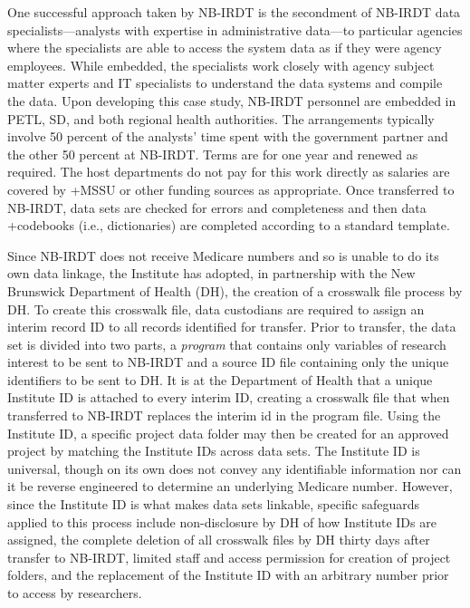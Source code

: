 \documentclass[
]{book}
\begin{document}
One successful approach taken by NB-IRDT is the secondment of NB-IRDT data specialists---analysts with expertise in administrative data---to particular agencies where the specialists are able to access the system data as if they were agency employees. While embedded, the specialists work closely with agency subject matter experts and IT specialists to understand the data systems and compile the data. Upon developing this case study, NB-IRDT personnel are embedded in PETL, SD, and both regional health authorities. The arrangements typically involve 50 percent of the analysts' time spent with the government partner and the other 50 percent at NB-IRDT. Terms are for one year and renewed as required. The host departments do not pay for this work directly as salaries are covered by +MSSU\textbar{} or other funding sources as appropriate. Once transferred to NB-IRDT, data sets are checked for errors and completeness and then data +codebooks\textbar{} (i.e., dictionaries) are completed according to a standard template.

Since NB-IRDT does not receive Medicare numbers and so is unable to do its own data linkage, the Institute has adopted, in partnership with the New Brunswick Department of Health (DH), the creation of a crosswalk file process by DH. To create this crosswalk file, data custodians are required to assign an interim record ID to all records identified for transfer. Prior to transfer, the data set is divided into two parts, a \emph{program} that contains only variables of research interest to be sent to NB-IRDT and a source ID file containing only the unique identifiers to be sent to DH. It is at the Department of Health that a unique Institute ID is attached to every interim ID, creating a crosswalk file that when transferred to NB-IRDT replaces the interim id in the program file. Using the Institute ID, a specific project data folder may then be created for an approved project by matching the Institute IDs across data sets. The Institute ID is universal, though on its own does not convey any identifiable information nor can it be reverse engineered to determine an underlying Medicare number. However, since the Institute ID is what makes data sets linkable, specific safeguards applied to this process include non-disclosure by DH of how Institute IDs are assigned, the complete deletion of all crosswalk files by DH thirty days after transfer to NB-IRDT, limited staff and access permission for creation of project folders, and the replacement of the Institute ID with an arbitrary number prior to access by researchers.
\end{document}
